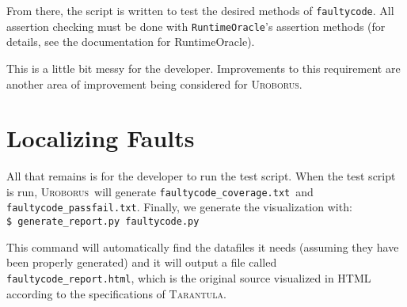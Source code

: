 \documentclass[english]{article}
\newcommand{\Uro}{\textsc{Uroborus}}
\newcommand{\Taran}{\textsc{Tarantula}}
\newcommand{\fc}{\texttt{faultycode}}
\newcommand{\fcp}{\texttt{faultycode.py}}
\newcommand{\fcc}{\texttt{faultycode_coverage.txt}}
\newcommand{\fcpf}{\texttt{faultycode_passfail.txt}}
\newcommand{\fch}{\texttt{faultycode_report.html}}
\begin{document}
From there, the script is written to test the desired methods of \fc. All assertion checking must be
done with \texttt{RuntimeOracle}'s assertion methods (for details, see the documentation for RuntimeOracle).

This is a little bit messy for the developer. Improvements to this requirement are another area of
improvement being considered for \Uro.

\section{Localizing Faults}

All that remains is for the developer to run the test script. When the test script is run, \Uro\
will generate \fcc\ and \fcpf. Finally, we generate the visualization with:\\
\texttt{\$ generate\_report.py }\fcp

This command will automatically find the datafiles it needs (assuming they have been properly
generated) and it will output a file called \fch, which is the original source visualized in HTML
according to the specifications of \Taran.
\end{document}
